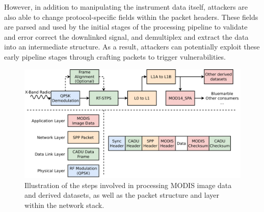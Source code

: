However, in addition to manipulating the instrument data itself, attackers are also able to change protocol-specific fields within the packet headers.
These fields are parsed and used by the initial stages of the processing pipeline to validate and error correct the downlinked signal, and demultiplex and extract the data into an intermediate structure.
As a result, attackers can potentially exploit these early pipeline stages through crafting packets to trigger vulnerabilities.

% 
% 
% 



\begin{figure}
    \centering
    \includegraphics[width=\linewidth]{diagrams/attack_types.pdf}
    \caption{Illustration of the steps involved in processing MODIS image data and derived datasets, as well as the packet structure and layer within the network stack.}
    \label{fig:attack_types}
\end{figure}



